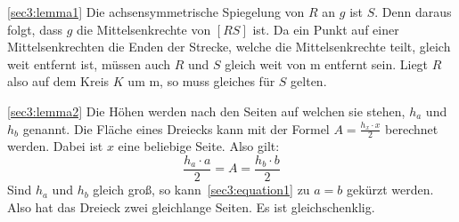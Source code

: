 \documentclass[10pt, a4paper]{amsart}
\makeatletter
\renewenvironment{proof}[1][\proofname]{\par
\pushQED{\qed}%
\normalfont \topsep6\p@\@plus6\p@\relax
\trivlist
\item\relax
{\bfseries#1}\hspace\labelsep\ignorespaces
}{%
\popQED\endtrivlist\@endpefalse
}
\newenvironment{proof_thm}[1]{
\begin{proof}[\proofname~(#1)]}{\end{proof}}
\makeatother
\begin{document}
\begin{proof_thm}{\autoref{sec3:lemma1}}
  Die achsensymmetrische Spiegelung von $R$ an $g$ ist $S$. Denn daraus folgt,
  dass $g$ die Mittelsenkrechte von $[RS]$ ist. Da ein Punkt auf einer
  Mittelsenkrechten die Enden der Strecke, welche die Mittelsenkrechte teilt,
  gleich weit entfernt ist, müssen auch $R$ und $S$ gleich weit von m entfernt
  sein. Liegt $R$ also auf dem Kreis $K$ um m, so muss gleiches für $S$ gelten.
\end{proof_thm}
\begin{proof_thm}{\autoref{sec3:lemma2}}
  Die Höhen werden nach den Seiten auf welchen sie stehen, $h_a$ und $h_b$
  genannt. Die Fläche eines Dreiecks kann mit der Formel $A=\frac{h_x\cdot
    x}{2}$ berechnet werden. Dabei ist $x$ eine beliebige Seite. Also gilt:
  \begin{equation}\label{sec3:equation1}
    \dfrac{h_a\cdot a}{2}=A=\dfrac{h_b\cdot b}{2}
  \end{equation}
  Sind $h_a$ und $h_b$ gleich groß, so kann~\eqref{sec3:equation1} zu $a=b$
  gekürzt werden. Also hat das Dreieck zwei gleichlange Seiten. Es ist
  gleichschenklig.
\end{proof_thm}
\end{document}

